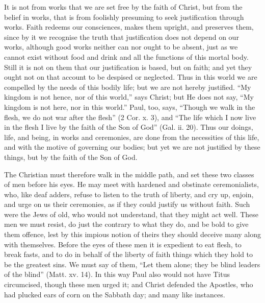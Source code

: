 It is not from works that we are set free by the faith of Christ, but from
the belief in works, that is from foolishly presuming to seek
justification through works. Faith redeems our consciences, makes them
upright, and preserves them, since by it we recognise the truth that
justification does not depend on our works, although good works neither
can nor ought to be absent, just as we cannot exist without food and drink
and all the functions of this mortal body. Still it is not on them that
our justification is based, but on faith; and yet they ought not on that
account to be despised or neglected. Thus in this world we are compelled
by the needs of this bodily life; but we are not hereby justified. ``My
kingdom is not hence, nor of this world,'' says Christ; but He does not
say, ``My kingdom is not here, nor in this world.'' Paul, too, says, ``Though
we walk in the flesh, we do not war after the flesh'' (2 Cor. x. 3), and
``The life which I now live in the flesh I live by the faith of the Son of
God'' (Gal. ii. 20). Thus our doings, life, and being, in works and
ceremonies, are done from the necessities of this life, and with the
motive of governing our bodies; but yet we are not justified by these
things, but by the faith of the Son of God.

The Christian must therefore walk in the middle path, and set these two
classes of men before his eyes. He may meet with hardened and obstinate
ceremonialists, who, like deaf adders, refuse to listen to the truth of
liberty, and cry up, enjoin, and urge on us their ceremonies, as if they
could justify us without faith. Such were the Jews of old, who would not
understand, that they might act well. These men we must resist, do just
the contrary to what they do, and be bold to give them offence, lest by
this impious notion of theirs they should deceive many along with
themselves. Before the eyes of these men it is expedient to eat flesh, to
break fasts, and to do in behalf of the liberty of faith things which they
hold to be the greatest sins. We must say of them, ``Let them alone; they
be blind leaders of the blind'' (Matt. xv. 14). In this way Paul also would
not have Titus circumcised, though these men urged it; and Christ defended
the Apostles, who had plucked ears of corn on the Sabbath day; and many
like instances.

